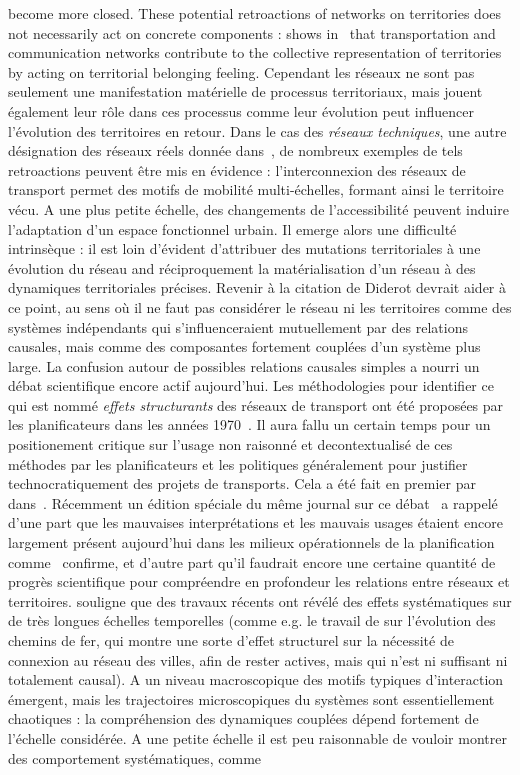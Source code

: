 {become more closed. These potential retroactions of networks on territories does not necessarily act on concrete components :  shows in~\cite{claval1987reseaux} that transportation and communication networks contribute to the collective representation of territories by acting on territorial belonging feeling.
}{
Cependant les réseaux ne sont pas seulement une manifestation matérielle de processus territoriaux, mais jouent également leur rôle dans ces processus comme leur évolution peut influencer l'évolution des territoires en retour. Dans le cas des \emph{réseaux techniques}, une autre désignation des réseaux réels donnée dans~\cite{offner1996reseaux}, de nombreux exemples de tels retroactions peuvent être mis en évidence : l'interconnexion des réseaux de transport permet des motifs de mobilité multi-échelles, formant ainsi le territoire vécu. A une plus petite échelle, des changements de l'accessibilité peuvent induire l'adaptation d'un espace fonctionnel urbain. Il emerge alors une difficulté intrinsèque : il est loin d'évident d'attribuer des mutations territoriales à une évolution du réseau and réciproquement la matérialisation d'un réseau à des dynamiques territoriales précises. Revenir à la citation de Diderot devrait aider à ce point, au sens où il ne faut pas considérer le réseau ni les territoires comme des systèmes indépendants qui s'influenceraient mutuellement par des relations causales, mais comme des composantes fortement couplées d'un système plus large. La confusion autour de possibles relations causales simples a nourri un débat scientifique encore actif aujourd'hui. Les méthodologies pour identifier ce qui est nommé \emph{effets structurants} des réseaux de transport ont été proposées par les planificateurs dans les années 1970~\cite{bonnafous1974detection,bonnafous1974methodologies}. Il aura fallu un certain temps pour un positionement critique sur l'usage non raisonné et decontextualisé de ces méthodes par les planificateurs et les politiques généralement pour justifier technocratiquement des projets de transports. Cela a été fait en premier par  dans~\cite{offner1993effets}. Récemment un édition spéciale du même journal sur ce débat~\cite{espacegeo2014effets} a rappelé d'une part que les mauvaises interprétations et les mauvais usages étaient encore largement présent aujourd'hui dans les milieux opérationnels de la planification comme~\cite{crozet:halshs-01094554} confirme, et d'autre part qu'il faudrait encore une certaine quantité de progrès scientifique pour compréendre en profondeur les relations entre réseaux et territoires.  souligne que des travaux récents ont révélé des effets systématiques sur de très longues échelles temporelles (comme e.g. le travail de  sur l'évolution des chemins de fer, qui montre une sorte d'effet structurel sur la nécessité de connexion au réseau des villes, afin de rester actives, mais qui n'est ni suffisant ni totalement causal). A un niveau macroscopique des motifs typiques d'interaction émergent, mais les trajectoires microscopiques du systèmes sont essentiellement chaotiques : la compréhension des dynamiques couplées dépend fortement de l'échelle considérée. A une petite échelle il est peu raisonnable de vouloir montrer des comportement systématiques, comme }

